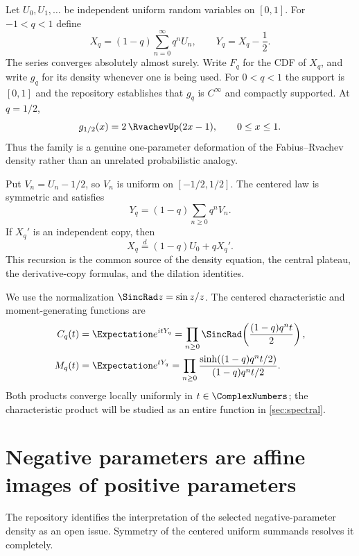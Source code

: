\documentclass[11pt,oneside]{article}
\theoremstyle{definition}
\theoremstyle{remark}
\begin{document}
Let $U_0,U_1,\ldots$ be independent uniform random variables on $[0,1]$.  For $-1<q<1$ define
\begin{equation}\label{eq:Xq-def}
 X_q=(1-q)\sum_{n=0}^{\infty}q^nU_n,
 \qquad
 Y_q=X_q-\frac12.
\end{equation}
The series converges absolutely almost surely.  Write $F_q$ for the CDF of $X_q$, and write $g_q$ for its density whenever one is being used.  For $0<q<1$ the support is $[0,1]$ and the repository establishes that $g_q$ is $C^\infty$ and compactly supported.  At $q=1/2$,
\begin{equation}\label{eq:fabius-up-bridge}
 g_{1/2}(x)=2\,\RvachevUp(2x-1),\qquad 0\le x\le1.
\end{equation}
Thus the family is a genuine one-parameter deformation of the Fabius--Rvachev density rather than an unrelated probabilistic analogy.

Put $V_n=U_n-1/2$, so $V_n$ is uniform on $[-1/2,1/2]$.  The centered law is symmetric and satisfies
\begin{equation}\label{eq:centered-series}
 Y_q=(1-q)\sum_{n\ge0}q^nV_n.
\end{equation}
If $X_q'$ is an independent copy, then
\begin{equation}\label{eq:distributional-recursion}
 X_q\overset d=(1-q)U_0+qX_q'.
\end{equation}
This recursion is the common source of the density equation, the central plateau, the derivative-copy formulas, and the dilation identities.

We use the normalization $\SincRad z=\sin z/z$.  The centered characteristic and moment-generating functions are
\begin{align}
 C_q(t)&=\Expectation e^{itY_q}
 =\prod_{n\ge0}\SincRad\!\left(\frac{(1-q)q^nt}{2}\right),\label{eq:Cq}\\
 M_q(t)&=\Expectation e^{tY_q}
 =\prod_{n\ge0}\frac{\sinh((1-q)q^nt/2)}{(1-q)q^nt/2}.
 \label{eq:Mq}
\end{align}
Both products converge locally uniformly in $t\in\ComplexNumbers$; the characteristic product will be studied as an entire function in \cref{sec:spectral}.

\section{Negative parameters are affine images of positive parameters}

The repository identifies the interpretation of the selected negative-parameter density as an open issue.  Symmetry of the centered uniform summands resolves it completely.
\end{document}
